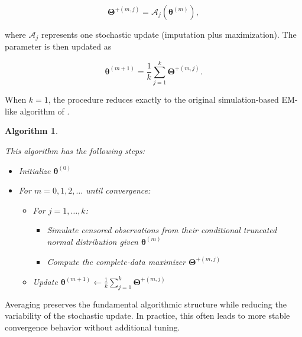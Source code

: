\documentclass[10pt,twoside]{article}
\newtheorem{alg}{Algorithm}
\numberwithin{equation}{section}
\begin{document}
\[

\boldsymbol{\Theta}^{+(m,j)} = \mathcal{A}_j(\boldsymbol{\theta}^{(m)}),

\]

where $\mathcal{A}_j$ represents one stochastic update (imputation plus maximization). The parameter is then updated as

\[

\boldsymbol{\theta}^{(m+1)} = \frac{1}{k}\sum_{j=1}^k \boldsymbol{\Theta}^{+(m,j)}.

\]

When $k=1$, the procedure reduces exactly to the original simulation-based EM-like algorithm of \citet{park2007}.



\begin{alg}\label{alg:PAEM}

This algorithm has the following steps:

\begin{itemize}

\item Initialize $\boldsymbol{\theta}^{(0)}$

\item For $m=0,1,2,\ldots$ until convergence:

\begin{itemize}

\item For $j=1,\ldots,k$:

\begin{itemize}

\item Simulate censored observations from their conditional truncated normal distribution given $\boldsymbol{\theta}^{(m)}$

\item Compute the complete-data maximizer $\boldsymbol{\Theta}^{+(m,j)}$

\end{itemize}

\item Update $\boldsymbol{\theta}^{(m+1)} \leftarrow \frac{1}{k}\sum_{j=1}^k \boldsymbol{\Theta}^{+(m,j)}$

\end{itemize}

\end{itemize}

\end{alg}



Averaging preserves the fundamental algorithmic structure while reducing the variability of the stochastic update. In practice, this often leads to more stable convergence behavior without additional tuning.
\end{document}
